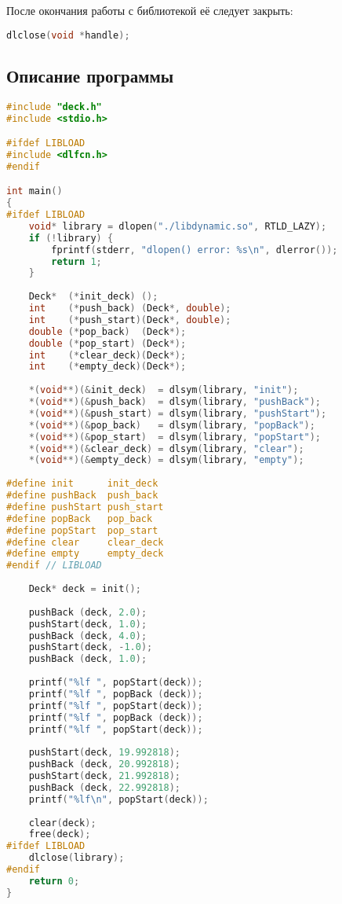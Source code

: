 \documentclass[12pt]{article}
\begin{document}
После окончания работы с библиотекой её следует закрыть:
\begin{lstlisting}[language=c]
dlclose(void *handle);
\end{lstlisting}

\subsection*{Описание программы}

{ \scriptsize
\begin{lstlisting}[language=c]
#include "deck.h"
#include <stdio.h>

#ifdef LIBLOAD
#include <dlfcn.h>
#endif

int main()
{
#ifdef LIBLOAD
    void* library = dlopen("./libdynamic.so", RTLD_LAZY);
    if (!library) {
        fprintf(stderr, "dlopen() error: %s\n", dlerror());
        return 1;
    }
    
    Deck*  (*init_deck) ();
    int    (*push_back) (Deck*, double);
    int    (*push_start)(Deck*, double);
    double (*pop_back)  (Deck*);
    double (*pop_start) (Deck*);
    int    (*clear_deck)(Deck*);
    int    (*empty_deck)(Deck*);
    
    *(void**)(&init_deck)  = dlsym(library, "init");
    *(void**)(&push_back)  = dlsym(library, "pushBack");
    *(void**)(&push_start) = dlsym(library, "pushStart");
    *(void**)(&pop_back)   = dlsym(library, "popBack");
    *(void**)(&pop_start)  = dlsym(library, "popStart");
    *(void**)(&clear_deck) = dlsym(library, "clear");
    *(void**)(&empty_deck) = dlsym(library, "empty");
    
#define init      init_deck
#define pushBack  push_back
#define pushStart push_start
#define popBack   pop_back
#define popStart  pop_start
#define clear     clear_deck
#define empty     empty_deck
#endif // LIBLOAD
    
    Deck* deck = init();
    
    pushBack (deck, 2.0);
    pushStart(deck, 1.0);
    pushBack (deck, 4.0);
    pushStart(deck, -1.0);
    pushBack (deck, 1.0);
    
    printf("%lf ", popStart(deck));
    printf("%lf ", popBack (deck));
    printf("%lf ", popStart(deck));
    printf("%lf ", popBack (deck));
    printf("%lf ", popStart(deck));
    
    pushStart(deck, 19.992818);
    pushBack (deck, 20.992818);
    pushStart(deck, 21.992818);
    pushBack (deck, 22.992818);
    printf("%lf\n", popStart(deck));
    
    clear(deck);
    free(deck);
#ifdef LIBLOAD
    dlclose(library);
#endif
    return 0;
}

\end{lstlisting}}
\end{document}
